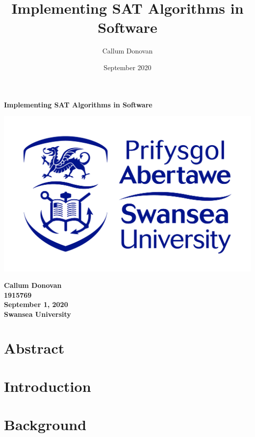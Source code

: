 \documentclass{article}
\title{\bfseries Implementing SAT Algorithms in Software}
\author{Callum Donovan}
\date{September 2020}
\begin{document}
\begin{titlepage}
    \begin{center}
        \Large{\bfseries Implementing SAT Algorithms in Software} \\
        \vspace{4cm}
        \begin{center}
            \includegraphics[scale=0.2]{swan.jpg}
        \end{center}
        \vspace*{\fill}
        \bfseries{\large Callum Donovan \\
            1915769 \\
            September 1, 2020 \\
            Swansea University \\}
    \end{center}
\end{titlepage}

\section{Abstract}
\lipsum[2-4]

\newpage
\tableofcontents

\newpage
\section{Introduction}
\lipsum[2-4]

\newpage
\section{Background}
\lipsum[2-4]
\end{document}
